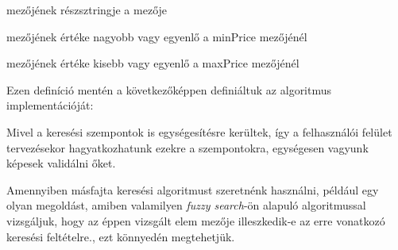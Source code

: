  \begin{listing}
 	\item {} mezőjének részsztringje a   mezője
 	\item {} mezőjének értéke nagyobb vagy egyenlő a  minPrice mezőjénél
 	\item {} mezőjének értéke kisebb vagy egyenlő a  maxPrice mezőjénél
 \end{listing}

Ezen definíció mentén a következőképpen definiáltuk az algoritmus implementációját: 


Mivel a keresési szempontok is egységesítésre kerültek, így a felhasználói felület tervezésekor hagyatkozhatunk ezekre a szempontokra, egységesen vagyunk képesek validálni őket. \par

Amennyiben másfajta keresési algoritmust szeretnénk használni, például egy olyan megoldást, amiben valamilyen \emph{fuzzy search}-ön \cite{hall1980approximate} alapuló algoritmussal vizsgáljuk, hogy az éppen vizsgált elem  mezője illeszkedik-e az erre vonatkozó keresési feltételre., ezt könnyedén megtehetjük.


